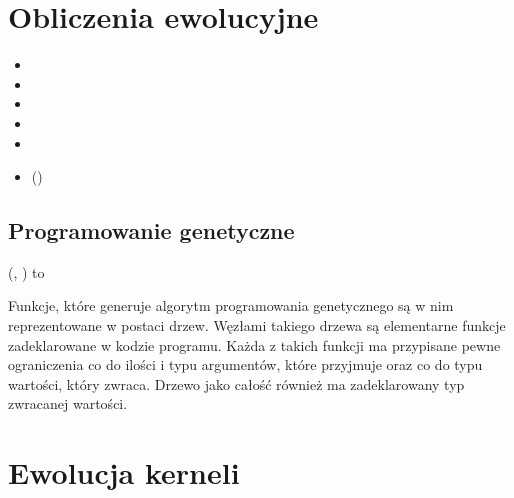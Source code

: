 \section{Obliczenia ewolucyjne}

\begin{itemize}
\item {}
\item {}
\item {}
\item {}
\item {}
\item {} ()
\end{itemize}

\subsection{Programowanie genetyczne}
 (, ) to 

Funkcje, które generuje algorytm programowania genetycznego są w nim reprezentowane w postaci drzew. Węzłami takiego drzewa są elementarne funkcje zadeklarowane w kodzie programu. Każda z takich funkcji ma przypisane pewne ograniczenia co do ilości i typu argumentów, które przyjmuje oraz co do typu wartości, który zwraca. Drzewo jako całość również ma zadeklarowany typ zwracanej wartości.

\section{Ewolucja kerneli}

\clearpage